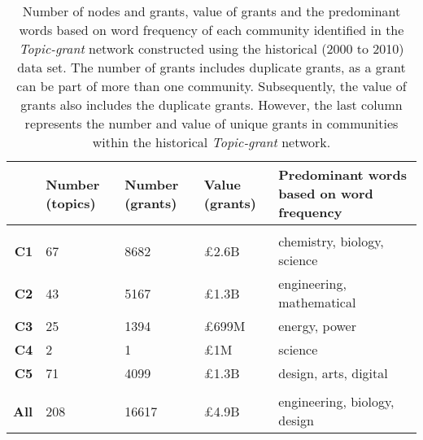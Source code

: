 \begin{table}[!htbp]
\centering
\caption[Number of nodes and grants, value of grants and the predominant words of each community identified in the \textit{Topic-grant} network constructed using the historical (2000 to 2010) data set]{Number of nodes and grants, value of grants and the predominant words based on word frequency of each community identified in the \textit{Topic-grant} network constructed using the historical (2000 to 2010) data set. The number of grants includes duplicate grants, as a grant can be part of more than one community. Subsequently, the value of grants also includes the duplicate grants. However, the last column represents the number and value of unique grants in communities within the historical \textit{Topic-grant} network.}
\label{table:topic_a_past1_numbers}
\begin{tabular}{r|>{\raggedleft\arraybackslash}p{1.6cm}>{\raggedleft\arraybackslash}p{1.6cm}>{\raggedleft\arraybackslash}p{1.6cm}>{\raggedleft\arraybackslash}p{6.3cm}}
{} & \textbf{Number (topics)} & \textbf{Number (grants)} & \textbf{Value (grants)} & \textbf{Predominant words based on word frequency}\\
\hline\\
\textbf{C1}  & {67}  & {8682}  & {\pounds2.6B} & {chemistry, biology, science}\\
\textbf{C2}  & {43}  & {5167}  & {\pounds1.3B} & {engineering, mathematical}\\
\textbf{C3}  & {25}  & {1394}  & {\pounds699M} & {energy, power}\\
\textbf{C4}  & {2}   & {1}     & {\pounds1M}   & {science}\\
\textbf{C5}  & {71}  & {4099}  & {\pounds1.3B} & {design, arts, digital}\\
\hline\\
\textbf{All} & {208} & {16617} & {\pounds4.9B} & {engineering, biology, design}\\
\end{tabular}
\end{table}

